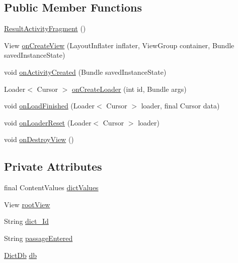 \subsection*{Public Member Functions}
\begin{DoxyCompactItemize}
\item 
\hyperlink{classorg_1_1buildmlearn_1_1dictation_1_1fragment_1_1ResultActivityFragment_afc52e8a0e932c6533b36ad57768ba077}{Result\+Activity\+Fragment} ()
\item 
View \hyperlink{classorg_1_1buildmlearn_1_1dictation_1_1fragment_1_1ResultActivityFragment_a46e705503e8134ab026ca105b9197ce3}{on\+Create\+View} (Layout\+Inflater inflater, View\+Group container, Bundle saved\+Instance\+State)
\item 
void \hyperlink{classorg_1_1buildmlearn_1_1dictation_1_1fragment_1_1ResultActivityFragment_ac3abae9c0eeef42003a25fa0ce4ac6eb}{on\+Activity\+Created} (Bundle saved\+Instance\+State)
\item 
Loader$<$ Cursor $>$ \hyperlink{classorg_1_1buildmlearn_1_1dictation_1_1fragment_1_1ResultActivityFragment_ab434ee36d097c2b0993ac6f2721544de}{on\+Create\+Loader} (int id, Bundle args)
\item 
void \hyperlink{classorg_1_1buildmlearn_1_1dictation_1_1fragment_1_1ResultActivityFragment_a4a9d91bdcc32254a777f14f1de0fff82}{on\+Load\+Finished} (Loader$<$ Cursor $>$ loader, final Cursor data)
\item 
void \hyperlink{classorg_1_1buildmlearn_1_1dictation_1_1fragment_1_1ResultActivityFragment_ada0968d8f38f2d1e21f53e2dc15a3418}{on\+Loader\+Reset} (Loader$<$ Cursor $>$ loader)
\item 
void \hyperlink{classorg_1_1buildmlearn_1_1dictation_1_1fragment_1_1ResultActivityFragment_a1860c6408b2cfbe9daf9ead5d5c41101}{on\+Destroy\+View} ()
\end{DoxyCompactItemize}
\subsection*{Private Attributes}
\begin{DoxyCompactItemize}
\item 
final Content\+Values \hyperlink{classorg_1_1buildmlearn_1_1dictation_1_1fragment_1_1ResultActivityFragment_a6d00bb0c2da38bad38f59a7d40ea5546}{dict\+Values}
\item 
View \hyperlink{classorg_1_1buildmlearn_1_1dictation_1_1fragment_1_1ResultActivityFragment_af65ba4a8c6a18b6421aa15a75de91c5e}{root\+View}
\item 
String \hyperlink{classorg_1_1buildmlearn_1_1dictation_1_1fragment_1_1ResultActivityFragment_a4b38e2aa38e3748cd3dec1757b29a29c}{dict\+\_\+\+Id}
\item 
String \hyperlink{classorg_1_1buildmlearn_1_1dictation_1_1fragment_1_1ResultActivityFragment_a899abafa90730100bd7e5b8f98442a27}{passage\+Entered}
\item 
\hyperlink{classorg_1_1buildmlearn_1_1dictation_1_1data_1_1DictDb}{Dict\+Db} \hyperlink{classorg_1_1buildmlearn_1_1dictation_1_1fragment_1_1ResultActivityFragment_adf7e580c08965bb9b9f1490aa4925576}{db}
\end{DoxyCompactItemize}
